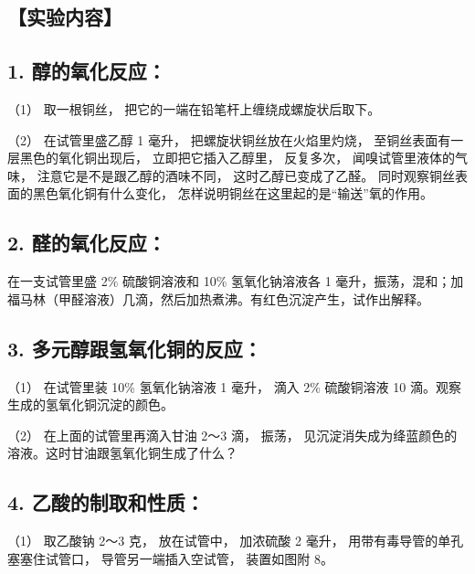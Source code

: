 \subsection{【实验内容】}

\subsection{1. 醇的氧化反应：}

（1） 取一根铜丝， 把它的一端在铅笔杆上缠绕成螺旋状后取下。

（2） 在试管里盛乙醇 1 毫升， 把螺旋状铜丝放在火焰里灼烧，
至铜丝表面有一层黑色的氧化铜出现后， 立即把它插入乙醇里， 反复多次，
闻嗅试管里液体的气味， 注意它是不是跟乙醇的酒味不同，
这时乙醇已变成了乙醛。 同时观察铜丝表面的黑色氧化铜有什么变化，
怎样说明铜丝在这里起的是``输送''氧的作用。

\subsection{2. 醛的氧化反应：}

在一支试管里盛 2\% 硫酸铜溶液和 10\% 氢氧化钠溶液各 1
毫升，振荡，混和；加福马林（甲醛溶液）几滴，然后加热煮沸。有红色沉淀产生，试作出解释。

\subsection{3. 多元醇跟氢氧化铜的反应：}

（1） 在试管里装 10\% 氢氧化钠溶液 1 毫升， 滴入 2\% 硫酸铜溶液 10
滴。观察生成的氢氧化铜沉淀的颜色。

（2） 在上面的试管里再滴入甘油 2～3 滴， 振荡，
见沉淀消失成为绛蓝颜色的溶液。这时甘油跟氢氧化铜生成了什么？

\subsection{4. 乙酸的制取和性质：}

（1） 取乙酸钠 2～3 克， 放在试管中， 加浓硫酸 2 毫升，
用带有毒导管的单孔塞塞住试管口， 导管另一端插入空试管， 装置如图附 8。

